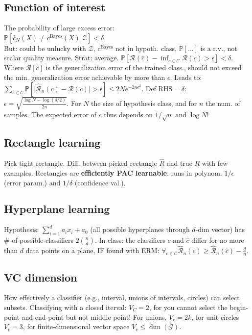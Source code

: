 \subsection*{Function of interest}
The probability of large excess error:\\
$\mathbb{P}[\hat{c}_N(X)\neq c^\text{Bayes}(X)|\mathcal{Z}]<\delta$.\\
But: could be unlucky with $\mathcal{Z}$, $c^\text{Bayes}$ not in hypoth. class, $\mathbb{P}[\dots]$ is a r.v., not scalar quality measure. Strat: average.
$\mathbb{P}[\mathcal{R}(\hat{c})-\inf_{c\in\mathcal{C}}\mathcal{R}(c)>\epsilon]<\delta$. Where $\mathcal{R}[\hat{c}]$ is the generalization error of the trained class., should not exceed the min. generalization error achievable by more than $\epsilon$.
Leads to:\\
$\sum_{c\in\mathcal{C}}\mathbb{P}[\lvert \hat{\mathcal{R}}_n(c)-\mathcal{R}(c)\rvert>\epsilon]\leq 2Ne^{-2n\epsilon^2}$. Def RHS$=\delta$: $\epsilon=\sqrt{\frac{\log N - \log(\delta/2)}{2n}}$. For $N$ the size of hypothesis class, and for $n$ the num. of samples. The expected error of $c$ thus depends on $1/\sqrt{n}$ and $\log N$!
\subsection*{Rectangle learning}
Pick tight rectangle. Diff. between picked rectangle $\hat{R}$ and true $R$ with few examples. Rectangles are \textbf{efficiently PAC learnable}: runs in polynom. $1/\epsilon$ (error param.) and $1/\delta$ (confidence val.).
\subsection*{Hyperplane learning}
Hypothesis: $\sum_{i=1}^d a_ix_i + a_0$ (all possible hyperplanes through $d$-dim vector) has \#-of-possible-classifiers $2\binom{n}{d}$. In class: the classifiers $c$ and $\hat{c}$ differ for no more than $d$ data points on a plane, IF found with ERM: $\forall_{c\in\mathcal{C}} \hat{\mathcal{R}}_n(c) \geq \hat{\mathcal{R}}_n(\hat{c}) - \frac{d}{n}$.
\subsection*{VC dimension}
How effectively a classifier (e.g., interval, unions of intervals, circles) can select subsets. Classifying with a closed iterval: $V_C=2$, for you cannot select the begin-point and end-point but not middle point! For unions, $V_c=2k$, for unit circles $V_c=3$, for finite-dimensional vector space $V_c\leq\dim(\mathcal{G})$.
